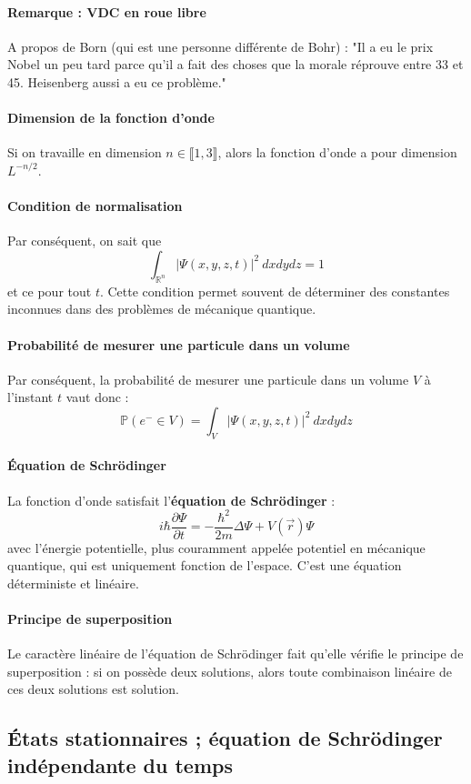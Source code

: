 \documentclass[french]{book}
\theoremstyle{plain}
\theoremstyle{definition}
\theoremstyle{remark}
\renewcommand{\P}{\mathbb{P}}
\newcommand{\R}{\mathbb{R}}
\begin{document}
\paragraph{Remarque : VDC en roue libre} A propos de Born (qui est une personne différente de Bohr) : "Il a eu le prix Nobel un peu tard parce qu'il a fait des choses que la morale réprouve entre 33 et 45. Heisenberg aussi a eu ce problème."
\paragraph{Dimension de la fonction d'onde} Si on travaille en dimension $n\in\llbracket 1,3\rrbracket$, alors la fonction d'onde a pour dimension $L^{-n/2}$.
\paragraph{Condition de normalisation} Par conséquent, on sait que $$\int_{\R^n} \lvert\Psi(x,y,z,t)\rvert^2 \ dxdydz=1$$ et ce pour tout $t$. Cette condition permet souvent de déterminer des constantes inconnues dans des problèmes de mécanique quantique.
\paragraph{Probabilité de mesurer une particule dans un volume} Par conséquent, la probabilité de mesurer une particule dans un volume $V$ à l'instant $t$ vaut donc : $$\P(e^-\in V)=\int_{V}\lvert \Psi(x,y,z,t)\rvert^2 \ dxdydz$$
\paragraph{Équation de Schrödinger} La fonction d'onde satisfait l'\textbf{équation de Schrödinger} : 
$$i\hbar\frac{\partial\Psi}{\partial t}=-\frac{\hbar^2}{2m}\Delta\Psi+V\left(\overrightarrow{r}\right)\Psi$$ avec l'énergie potentielle, plus couramment appelée potentiel en mécanique quantique, qui est uniquement fonction de l'espace. C'est une équation déterministe et linéaire.
\paragraph{Principe de superposition} Le caractère linéaire de l'équation de Schrödinger fait qu'elle vérifie le principe de superposition : si on possède deux solutions, alors toute combinaison linéaire de ces deux solutions est solution.
\subsection{États stationnaires ; équation de Schrödinger indépendante du temps}
\end{document}
